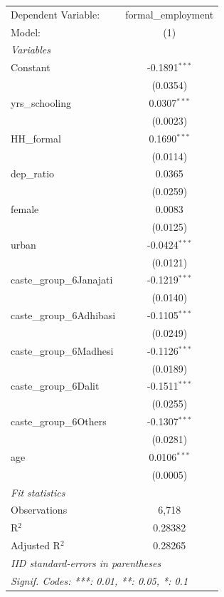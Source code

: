 
\begin{table}[htb ]
\centering
\begin{tabular}{lc}
   \tabularnewline \midrule \midrule
   Dependent Variable:       & formal\_employment\\   
   Model:                    & (1)\\  
   \midrule
   \emph{Variables}\\
   Constant                  & -0.1891$^{***}$\\   
                             & (0.0354)\\   
   yrs\_schooling            & 0.0307$^{***}$\\   
                             & (0.0023)\\   
   HH\_formal                & 0.1690$^{***}$\\   
                             & (0.0114)\\   
   dep\_ratio                & 0.0365\\   
                             & (0.0259)\\   
   female                    & 0.0083\\   
                             & (0.0125)\\   
   urban                     & -0.0424$^{***}$\\   
                             & (0.0121)\\   
   caste\_group\_6Janajati   & -0.1219$^{***}$\\   
                             & (0.0140)\\   
   caste\_group\_6Adhibasi   & -0.1105$^{***}$\\   
                             & (0.0249)\\   
   caste\_group\_6Madhesi    & -0.1126$^{***}$\\   
                             & (0.0189)\\   
   caste\_group\_6Dalit      & -0.1511$^{***}$\\   
                             & (0.0255)\\   
   caste\_group\_6Others     & -0.1307$^{***}$\\   
                             & (0.0281)\\   
   age                       & 0.0106$^{***}$\\   
                             & (0.0005)\\   
   \midrule
   \emph{Fit statistics}\\
   Observations              & 6,718\\  
   R$^2$                     & 0.28382\\  
   Adjusted R$^2$            & 0.28265\\  
   \midrule \midrule
   \multicolumn{2}{l}{\emph{IID standard-errors in parentheses}}\\
   \multicolumn{2}{l}{\emph{Signif. Codes: ***: 0.01, **: 0.05, *: 0.1}}\\
\end{tabular}
\end{table}

